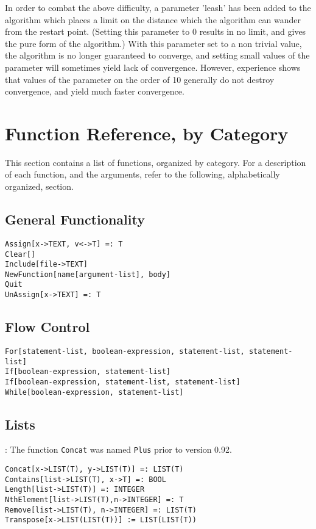 In order to combat the above difficulty, a parameter 'leash' has been
added to the algorithm which places a limit on the distance which the
algorithm can wander from the restart point. (Setting this parameter
to 0 results in no limit, and gives the pure form of the algorithm.)
With this parameter set to a non trivial value, the algorithm is no
longer guaranteed to converge, and setting small values of the
parameter will sometimes yield lack of convergence.  However,
experience shows that values of the parameter on the order of 10
generally do not destroy convergence, and yield much faster
convergence.

\section{Function Reference, by Category}

This section contains a list of functions, organized by
category.  For a description of each function, and the arguments,
refer to the following, alphabetically organized, section.

\subsection{General Functionality}

\begin{verbatim}
Assign[x->TEXT, v<->T] =: T
Clear[]
Include[file->TEXT]
NewFunction[name[argument-list], body]
Quit
UnAssign[x->TEXT] =: T
\end{verbatim}

\subsection{Flow Control}

\begin{verbatim}
For[statement-list, boolean-expression, statement-list, statement-list]
If[boolean-expression, statement-list]
If[boolean-expression, statement-list, statement-list]
While[boolean-expression, statement-list]
\end{verbatim}

\subsection{Lists}

: The function {\tt Concat} was named {\tt Plus}
prior to version 0.92.

\begin{verbatim}
Concat[x->LIST(T), y->LIST(T)] =: LIST(T)
Contains[list->LIST(T), x->T] =: BOOL
Length[list->LIST(T)] =: INTEGER
NthElement[list->LIST(T),n->INTEGER] =: T 
Remove[list->LIST(T), n->INTEGER] =: LIST(T)
Transpose[x->LIST(LIST(T))] := LIST(LIST(T))
\end{verbatim}

